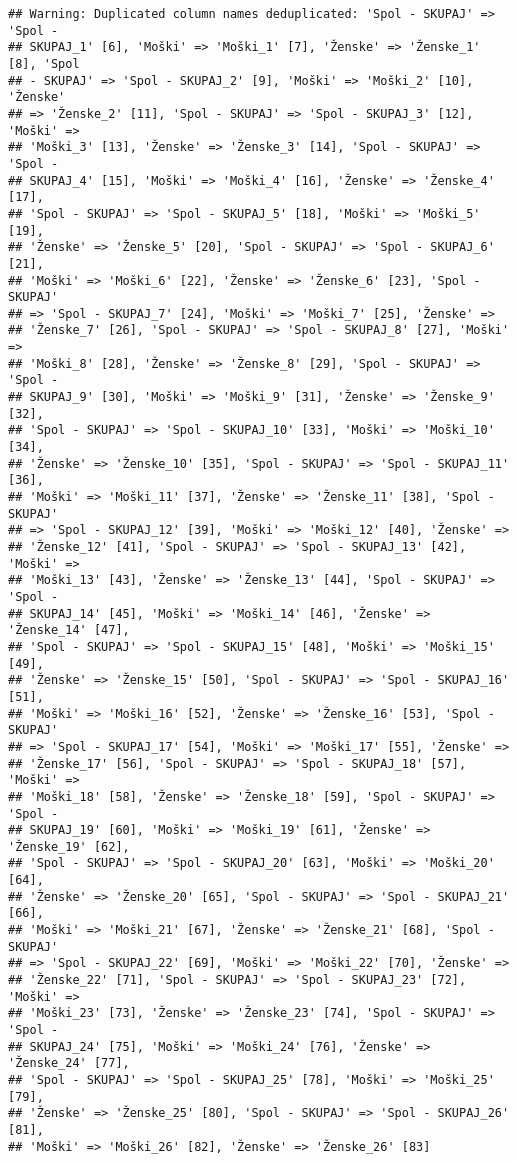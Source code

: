 \documentclass[]{article}
\begin{document}
\begin{verbatim}
## Warning: Duplicated column names deduplicated: 'Spol - SKUPAJ' => 'Spol -
## SKUPAJ_1' [6], 'Moški' => 'Moški_1' [7], 'Ženske' => 'Ženske_1' [8], 'Spol
## - SKUPAJ' => 'Spol - SKUPAJ_2' [9], 'Moški' => 'Moški_2' [10], 'Ženske'
## => 'Ženske_2' [11], 'Spol - SKUPAJ' => 'Spol - SKUPAJ_3' [12], 'Moški' =>
## 'Moški_3' [13], 'Ženske' => 'Ženske_3' [14], 'Spol - SKUPAJ' => 'Spol -
## SKUPAJ_4' [15], 'Moški' => 'Moški_4' [16], 'Ženske' => 'Ženske_4' [17],
## 'Spol - SKUPAJ' => 'Spol - SKUPAJ_5' [18], 'Moški' => 'Moški_5' [19],
## 'Ženske' => 'Ženske_5' [20], 'Spol - SKUPAJ' => 'Spol - SKUPAJ_6' [21],
## 'Moški' => 'Moški_6' [22], 'Ženske' => 'Ženske_6' [23], 'Spol - SKUPAJ'
## => 'Spol - SKUPAJ_7' [24], 'Moški' => 'Moški_7' [25], 'Ženske' =>
## 'Ženske_7' [26], 'Spol - SKUPAJ' => 'Spol - SKUPAJ_8' [27], 'Moški' =>
## 'Moški_8' [28], 'Ženske' => 'Ženske_8' [29], 'Spol - SKUPAJ' => 'Spol -
## SKUPAJ_9' [30], 'Moški' => 'Moški_9' [31], 'Ženske' => 'Ženske_9' [32],
## 'Spol - SKUPAJ' => 'Spol - SKUPAJ_10' [33], 'Moški' => 'Moški_10' [34],
## 'Ženske' => 'Ženske_10' [35], 'Spol - SKUPAJ' => 'Spol - SKUPAJ_11' [36],
## 'Moški' => 'Moški_11' [37], 'Ženske' => 'Ženske_11' [38], 'Spol - SKUPAJ'
## => 'Spol - SKUPAJ_12' [39], 'Moški' => 'Moški_12' [40], 'Ženske' =>
## 'Ženske_12' [41], 'Spol - SKUPAJ' => 'Spol - SKUPAJ_13' [42], 'Moški' =>
## 'Moški_13' [43], 'Ženske' => 'Ženske_13' [44], 'Spol - SKUPAJ' => 'Spol -
## SKUPAJ_14' [45], 'Moški' => 'Moški_14' [46], 'Ženske' => 'Ženske_14' [47],
## 'Spol - SKUPAJ' => 'Spol - SKUPAJ_15' [48], 'Moški' => 'Moški_15' [49],
## 'Ženske' => 'Ženske_15' [50], 'Spol - SKUPAJ' => 'Spol - SKUPAJ_16' [51],
## 'Moški' => 'Moški_16' [52], 'Ženske' => 'Ženske_16' [53], 'Spol - SKUPAJ'
## => 'Spol - SKUPAJ_17' [54], 'Moški' => 'Moški_17' [55], 'Ženske' =>
## 'Ženske_17' [56], 'Spol - SKUPAJ' => 'Spol - SKUPAJ_18' [57], 'Moški' =>
## 'Moški_18' [58], 'Ženske' => 'Ženske_18' [59], 'Spol - SKUPAJ' => 'Spol -
## SKUPAJ_19' [60], 'Moški' => 'Moški_19' [61], 'Ženske' => 'Ženske_19' [62],
## 'Spol - SKUPAJ' => 'Spol - SKUPAJ_20' [63], 'Moški' => 'Moški_20' [64],
## 'Ženske' => 'Ženske_20' [65], 'Spol - SKUPAJ' => 'Spol - SKUPAJ_21' [66],
## 'Moški' => 'Moški_21' [67], 'Ženske' => 'Ženske_21' [68], 'Spol - SKUPAJ'
## => 'Spol - SKUPAJ_22' [69], 'Moški' => 'Moški_22' [70], 'Ženske' =>
## 'Ženske_22' [71], 'Spol - SKUPAJ' => 'Spol - SKUPAJ_23' [72], 'Moški' =>
## 'Moški_23' [73], 'Ženske' => 'Ženske_23' [74], 'Spol - SKUPAJ' => 'Spol -
## SKUPAJ_24' [75], 'Moški' => 'Moški_24' [76], 'Ženske' => 'Ženske_24' [77],
## 'Spol - SKUPAJ' => 'Spol - SKUPAJ_25' [78], 'Moški' => 'Moški_25' [79],
## 'Ženske' => 'Ženske_25' [80], 'Spol - SKUPAJ' => 'Spol - SKUPAJ_26' [81],
## 'Moški' => 'Moški_26' [82], 'Ženske' => 'Ženske_26' [83]
\end{verbatim}
\end{document}
